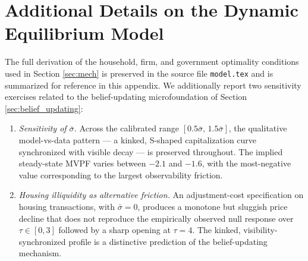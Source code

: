 



\section{Additional Details on the Dynamic Equilibrium Model} \label{sec:appxdmodel}

The full derivation of the household, firm, and government optimality conditions used in Section \ref{sec:mech} is preserved in the source file \texttt{model.tex} and is summarized for reference in this appendix. We additionally report two sensitivity exercises related to the belief-updating microfoundation of Section \ref{sec:belief_updating}:

\begin{enumerate}
\item {\it Sensitivity of $\bar{\sigma}$.} Across the calibrated range $[0.5 \bar{\sigma},\, 1.5 \bar{\sigma}]$, the qualitative model-vs-data pattern --- a kinked, S-shaped capitalization curve synchronized with visible decay --- is preserved throughout. The implied steady-state MVPF varies between $-2.1$ and $-1.6$, with the most-negative value corresponding to the largest observability friction.
\item {\it Housing illiquidity as alternative friction.} An adjustment-cost specification on housing transactions, with $\bar{\sigma}=0$, produces a monotone but sluggish price decline that does not reproduce the empirically observed null response over $\tau \in [0,3]$ followed by a sharp opening at $\tau = 4$. The kinked, visibility-synchronized profile is a distinctive prediction of the belief-updating mechanism.
\end{enumerate}

